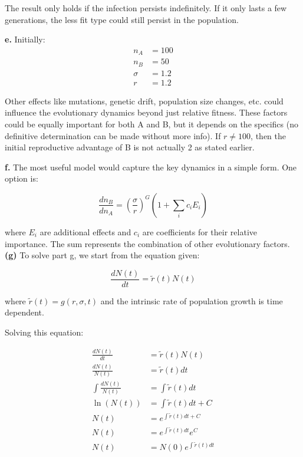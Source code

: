 \documentclass{article}
\begin{document}
The result only holds if the infection persists indefinitely. If it only lasts a few generations, the less fit type could still persist in the population.

\textbf{e.} Initially: 
\begin{align*}
n_A &= 100 \\
n_B &= 50 \\
\sigma &= 1.2 \\
r &= 1.2
\end{align*}

Other effects like mutations, genetic drift, population size changes, etc. could influence the evolutionary dynamics beyond just relative fitness. These factors could be equally important for both A and B, but it depends on the specifics (no definitive determination can be made without more info). If $r \neq 100$, then the initial reproductive advantage of B is not actually 2 as stated earlier.

\textbf{f.} The most useful model would capture the key dynamics in a simple form. One option is:

\begin{equation*}
\frac{dn_B}{dn_A} = \left(\frac{\sigma}{r}\right)^G \left(1 + \sum_{i} c_i E_i \right)
\end{equation*}

where $E_i$ are additional effects and $c_i$ are coefficients for their relative importance. The sum represents the combination of other evolutionary factors.\\

\textbf{(g)} To solve part g, we start from the equation given:

\begin{equation*}
\frac{dN(t)}{dt} = \tilde{r}(t)N(t)
\end{equation*}

where $\tilde{r}(t) = g(r,\sigma,t)$ and the intrinsic rate of population growth is time dependent.

Solving this equation:

\begin{align*}
\frac{dN(t)}{dt} &= \tilde{r}(t)N(t) \\
\frac{dN(t)}{N(t)} &= \tilde{r}(t)dt \\
\int \frac{dN(t)}{N(t)} &= \int \tilde{r}(t)dt \\
\ln(N(t)) &= \int \tilde{r}(t)dt + C \\
N(t) &= e^{\int \tilde{r}(t)dt + C} \\
N(t) &= e^{\int \tilde{r}(t)dt} e^C \\
N(t) &= N(0)e^{\int \tilde{r}(t)dt}
\end{align*}
\end{document}
